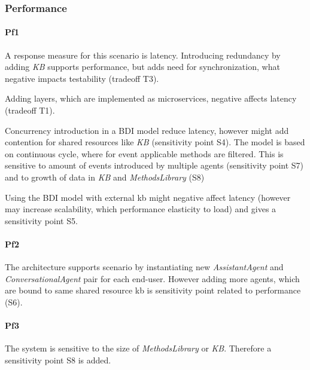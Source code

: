 \documentclass{llncs}
\begin{document}
\subsubsection{Performance}
\paragraph{Pf1} A response measure for this scenario is latency. 
Introducing redundancy by adding \emph{KB} supports performance, but adds need for synchronization, what negative impacts testability (tradeoff T3).

Adding layers, which are implemented as microservices, negative affects latency (tradeoff T1). 

Concurrency introduction in a \gls{BDI} model reduce latency, however might add contention for shared resources like \emph{KB} (sensitivity point S4). The model is based on continuous cycle, where for event applicable methods are filtered. This is sensitive to amount of events introduced by multiple agents (sensitivity point S7) and to growth of data in \emph{KB} and \emph{MethodsLibrary} (S8) 

Using the \gls{BDI} model with external \gls{kb} might negative affect latency (however may increase scalability, which performance elasticity to load) and gives a sensitivity point S5. 
\paragraph{Pf2} The architecture supports scenario by instantiating new \emph{AssistantAgent} and \emph{ConversationalAgent} pair for each end-user. However adding more agents, which are bound to same shared resource \gls{kb} is sensitivity point related to performance (S6).
\paragraph{Pf3} The system is sensitive to the size of \emph{MethodsLibrary} or \emph{KB}. Therefore a sensitivity point S8 is added.
\end{document}
